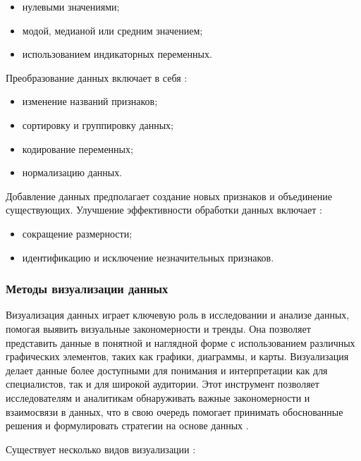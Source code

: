 \begin{itemize}
	\item нулевыми значениями;
	\item модой, медианой или средним значением;
	\item использованием индикаторных переменных.
\end{itemize}

Преобразование данных включает в себя :

\begin{itemize}
	\item изменение названий признаков;
	\item сортировку и группировку данных;
	\item кодирование переменных;
	\item нормализацию данных.
\end{itemize}

Добавление данных предполагает создание новых признаков и объединение существующих.
Улучшение эффективности обработки данных включает :

\begin{itemize}
	\item сокращение размерности;
	\item идентификацию и исключение незначительных признаков.
\end{itemize}

\subsubsection{Методы визуализации данных}

Визуализация данных играет ключевую роль в исследовании и анализе данных, помогая выявить визуальные закономерности и тренды. Она позволяет представить данные в понятной и наглядной форме с использованием различных графических элементов, таких как графики, диаграммы, и карты. Визуализация делает данные более доступными для понимания и интерпретации как для специалистов, так и для широкой аудитории. Этот инструмент позволяет исследователям и аналитикам обнаруживать важные закономерности и взаимосвязи в данных, что в свою очередь помогает принимать обоснованные решения и формулировать стратегии на основе данных .

Существует несколько видов визуализации :

